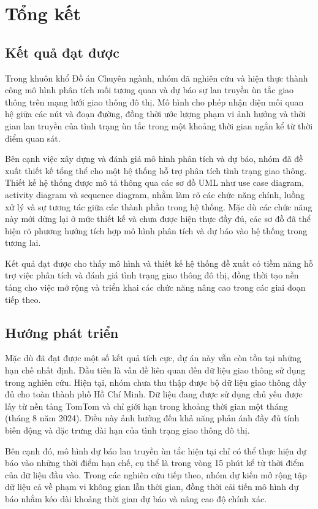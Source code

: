 \section{Tổng kết}
\subsection{Kết quả đạt được}
Trong khuôn khổ Đồ án Chuyên ngành, nhóm đã nghiên cứu và hiện thực thành công mô hình phân tích mối tương quan và dự báo sự lan truyền ùn tắc giao thông trên mạng lưới giao thông đô thị. Mô hình cho phép nhận diện mối quan hệ giữa các nút và đoạn đường, đồng thời ước lượng phạm vi ảnh hưởng và thời gian lan truyền của tình trạng ùn tắc trong một khoảng thời gian ngắn kể từ thời điểm quan sát.

Bên cạnh việc xây dựng và đánh giá mô hình phân tích và dự báo, nhóm đã đề xuất thiết kế tổng thể cho một hệ thống hỗ trợ phân tích tình trạng giao thông. Thiết kế hệ thống được mô tả thông qua các sơ đồ UML như use case diagram, activity diagram và sequence diagram, nhằm làm rõ các chức năng chính, luồng xử lý và sự tương tác giữa các thành phần trong hệ thống. Mặc dù các chức năng này mới dừng lại ở mức thiết kế và chưa được hiện thực đầy đủ, các sơ đồ đã thể hiện rõ phương hướng tích hợp mô hình phân tích và dự báo vào hệ thống trong tương lai.

Kết quả đạt được cho thấy mô hình và thiết kế hệ thống đề xuất có tiềm năng hỗ trợ việc phân tích và đánh giá tình trạng giao thông đô thị, đồng thời tạo nền tảng cho việc mở rộng và triển khai các chức năng nâng cao trong các giai đoạn tiếp theo.
\subsection{Hướng phát triển}
Mặc dù đã đạt được một số kết quả tích cực, dự án này vẫn còn tồn tại những hạn chế nhất định. Đầu tiên là vấn đề liên quan đến dữ liệu giao thông sử dụng trong nghiên cứu. Hiện tại, nhóm chưa thu thập được bộ dữ liệu giao thông đầy đủ cho toàn thành phố Hồ Chí Minh. Dữ liệu đang được sử dụng chủ yếu được lấy từ nền tảng TomTom và chỉ giới hạn trong khoảng thời gian một tháng (tháng 8 năm 2024). Điều này ảnh hưởng đến khả năng phản ánh đầy đủ tính biến động và đặc trưng dài hạn của tình trạng giao thông đô thị.

Bên cạnh đó, mô hình dự báo lan truyền ùn tắc hiện tại chỉ có thể thực hiện dự báo vào những thời điểm hạn chế, cụ thể là trong vòng 15 phút kể từ thời điểm của dữ liệu đầu vào. Trong các nghiên cứu tiếp theo, nhóm dự kiến mở rộng tập dữ liệu cả về phạm vi không gian lẫn thời gian, đồng thời cải tiến mô hình dự báo nhằm kéo dài khoảng thời gian dự báo và nâng cao độ chính xác.

